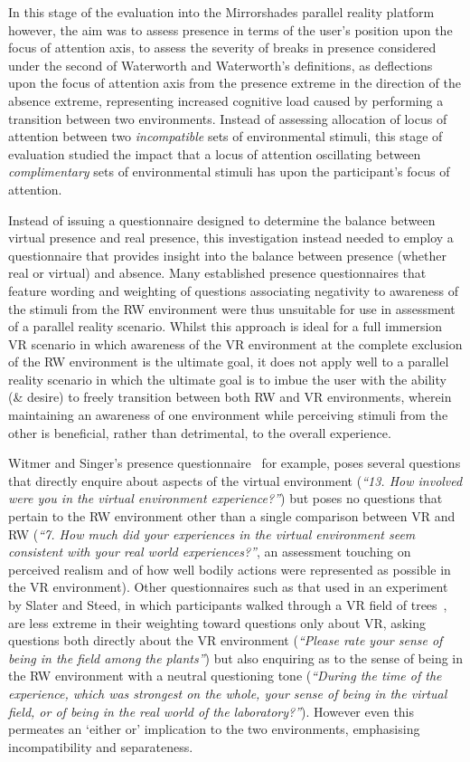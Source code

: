 In this stage of the evaluation into the Mirrorshades parallel reality platform however, the aim was to assess presence in terms of the user's position upon the focus of attention axis, to assess the severity of breaks in presence considered under the second of Waterworth and Waterworth's definitions, as deflections upon the focus of attention axis from the presence extreme in the direction of the absence extreme, representing increased cognitive load caused by performing a transition between two environments. Instead of assessing allocation of locus of attention between two \textit{incompatible} sets of environmental stimuli, this stage of evaluation studied the impact that a locus of attention oscillating between \textit{complimentary} sets of environmental stimuli has upon the participant's focus of attention.

Instead of issuing a questionnaire designed to determine the balance between virtual presence and real presence, this investigation instead needed to employ a questionnaire that provides insight into the balance between presence (whether real or virtual) and absence. Many established presence questionnaires that feature wording and weighting of questions associating negativity to awareness of the stimuli from the RW environment were thus unsuitable for use in assessment of a parallel reality scenario. Whilst this approach is ideal for a full immersion VR scenario in which awareness of the VR environment at the complete exclusion of the RW environment is the ultimate goal, it does not apply well to a parallel reality scenario in which the ultimate goal is to imbue the user with the ability (\& desire) to freely transition between both RW and VR environments, wherein maintaining an awareness of one environment while perceiving stimuli from the other is beneficial, rather than detrimental, to the overall experience.

Witmer and Singer's presence questionnaire~\cite{Witmer1998} for example, poses several questions that directly enquire about aspects of the virtual environment (\textit{``13. How involved were you in the virtual environment experience?''}) but poses no questions that pertain to the RW environment other than a single comparison between VR and RW (\textit{``7. How much did your experiences in the virtual environment seem consistent with your real world experiences?''}, an assessment touching on perceived realism and of how well bodily actions were represented as possible in the VR environment). Other questionnaires such as that used in an experiment by Slater and Steed, in which participants walked through a VR field of trees~\cite{Slater1998}, are less extreme in their weighting toward questions only about VR, asking questions both directly about the VR environment (\textit{``Please rate your sense of being in the field among the plants''}) but also enquiring as to the sense of being in the RW environment with a neutral questioning tone (\textit{``During the time of the experience, which was strongest on the whole, your sense of being in the virtual field, or of being in the real world of the laboratory?''}). However even this permeates an `either or' implication to the two environments, emphasising incompatibility and separateness.

